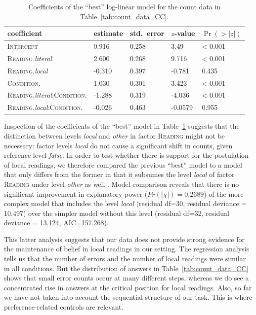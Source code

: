 \documentclass[fleqn,reqno,10pt]{article}
\renewcommand{\es}{\acro{es}}
\begin{document}
\begin{table}
  \centering
  \begin{tabular}{lllll}
    coefficient & estimate & std.~error & $z$-value & $\Pr(>|z|)$ \\
    \midrule
    \textsc{Intercept} & 0.916  &  0.258 &  3.49  & < 0.001 \\
    \textsc{Reading}.\emph{literal} & 2.600 &   0.268 & 9.716 & < 0.001 \\
    \textsc{Reading}.\emph{local} & -0.310  &  0.397 & -0.781 &
    0.435 \\
    \textsc{Condition}.\es & 1.030 &  0.301 & 3.423 &  < 0.001 \\
    \textsc{Reading}.\emph{literal}:\textsc{Condition}.\es & -1.288 &
    0.319 & -4.036 &  < 0.001 \\
    \textsc{Reading}.\emph{local}:\textsc{Condition}.\es & -0.026 &
    0.463 &  -0.0579 &  0.955
  \end{tabular}
  \caption{Coefficients of the ``best'' log-linear model for the count
    data in Table~\ref{tab:count_data_CC}.}
  \label{tab:Coefficients-CC}
\end{table}

Inspection of the coefficients of the ``best'' model in
Table~\ref{tab:Coefficients-CC} suggests that the distinction between
levels \emph{local} and \emph{other} in factor \textsc{Reading} might
not be necessary: factor levels \emph{local} do not cause a
significant shift in counts, given reference level \emph{false}. In
order to test whether there is support for the postulation of local
readings, we therefore compared the previous ``best'' model to a
model that only differs from the former in that it subsumes the level
\emph{local} of factor \textsc{Reading} under level \emph{other} as
well \citep[e.g.][Chapter~15]{Crawley2007:The-R-Book}. Model
comparison reveals that there is no significant improvement in
explanatory power ($Pr(|\chi|) = 0.2689$) of the more complex model
that includes the level \emph{local} (residual df=30, residual
deviance = 10.497) over the simpler model without this level (residual
df=32, residual deviance = 13.124, AIC=157.268).

This latter analysis suggests that our data does not provide strong
evidence for the maintenance of belief in local readings in our
setting. The regression analysis tells us that the number of errors
and the number of local readings were similar in all conditions. But
the distribution of answers in Table~\ref{tab:count_data_CC} shows
that small error counts occur at many different steps, whereas we do
see a concentrated rise in answers at the critical position for local
readings. Also, so far we have not taken into account the sequential
structure of our task. This is where preference-related controls
are relevant.
\end{document}
